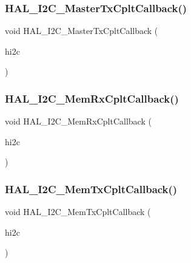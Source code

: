 \subsubsection{\texorpdfstring{H\+A\+L\+\_\+\+I2\+C\+\_\+\+Master\+Tx\+Cplt\+Callback()}{HAL\_I2C\_MasterTxCpltCallback()}}
{\footnotesize\ttfamily void H\+A\+L\+\_\+\+I2\+C\+\_\+\+Master\+Tx\+Cplt\+Callback (\begin{DoxyParamCaption}\item[{\hyperlink{group___i2_c__handle___structure__definition_ga68e9f45c2fd2161fb827ccdeabb55ea5}{I2\+C\+\_\+\+Handle\+Type\+Def} $\ast$}]{hi2c }\end{DoxyParamCaption})}

\mbox{\label{group___i2_c___i_r_q___handler__and___callbacks_gac16a95413b35f05c5ce725fefd8531a5}} 
\subsubsection{\texorpdfstring{H\+A\+L\+\_\+\+I2\+C\+\_\+\+Mem\+Rx\+Cplt\+Callback()}{HAL\_I2C\_MemRxCpltCallback()}}
{\footnotesize\ttfamily void H\+A\+L\+\_\+\+I2\+C\+\_\+\+Mem\+Rx\+Cplt\+Callback (\begin{DoxyParamCaption}\item[{\hyperlink{group___i2_c__handle___structure__definition_ga68e9f45c2fd2161fb827ccdeabb55ea5}{I2\+C\+\_\+\+Handle\+Type\+Def} $\ast$}]{hi2c }\end{DoxyParamCaption})}

\mbox{\label{group___i2_c___i_r_q___handler__and___callbacks_ga874f6104d2cdbced9f2ab6e941ec58f0}} 
\subsubsection{\texorpdfstring{H\+A\+L\+\_\+\+I2\+C\+\_\+\+Mem\+Tx\+Cplt\+Callback()}{HAL\_I2C\_MemTxCpltCallback()}}
{\footnotesize\ttfamily void H\+A\+L\+\_\+\+I2\+C\+\_\+\+Mem\+Tx\+Cplt\+Callback (\begin{DoxyParamCaption}\item[{\hyperlink{group___i2_c__handle___structure__definition_ga68e9f45c2fd2161fb827ccdeabb55ea5}{I2\+C\+\_\+\+Handle\+Type\+Def} $\ast$}]{hi2c }\end{DoxyParamCaption})}

